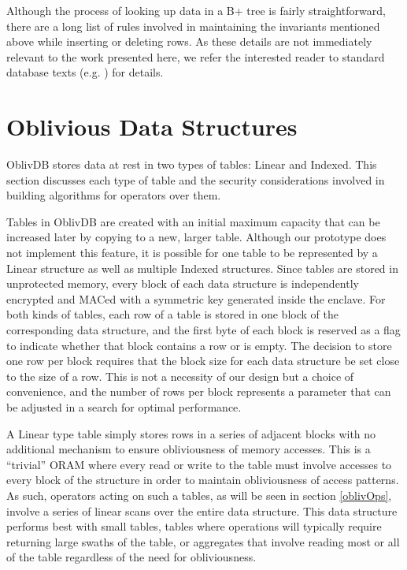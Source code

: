 \documentclass[conference]{IEEEtran}
\def\name/{OblivDB}
\begin{document}
Although the process of looking up data in a B+ tree is fairly straightforward, there are a long list of rules involved in maintaining the invariants mentioned above while inserting or deleting rows. As these details are not immediately relevant to the work presented here, we refer the interested reader to standard database texts (e.g. \cite{EN10}) for details. 

\section{Oblivious Data Structures}\label{oblivData}
\name/ stores data at rest in two types of tables: Linear and Indexed. This section discusses each type of table and the security considerations involved in building algorithms for operators over them. 

Tables in \name/ are created with an initial maximum capacity that can be increased later by copying to a new, larger table. Although our prototype does not implement this feature, it is possible for one table to be represented by a Linear structure as well as multiple Indexed structures. Since tables are stored in unprotected memory, every block of each data structure is independently encrypted and MACed with a symmetric key generated inside the enclave. For both kinds of tables, each row of a table is stored in one block of the corresponding data structure, and the first byte of each block is reserved as a flag to indicate whether that block contains a row or is empty. The decision to store one row per block requires that the block size for each data structure be set close to the size of a row. This is not a necessity of our design but a choice of convenience, and the number of rows per block represents a parameter that can be adjusted in a search for optimal performance.

A Linear type table simply stores rows in a series of adjacent blocks with no additional mechanism to ensure obliviousness of memory accesses. This is a ``trivial'' ORAM where every read or write to the table must involve accesses to every block of the structure in order to maintain obliviousness of access patterns. As such, operators acting on such a tables, as will be seen in section \ref{oblivOps}, involve a series of linear scans over the entire data structure. This data structure performs best with small tables, tables where operations will typically require returning large swaths of the table, or aggregates that involve reading most or all of the table regardless of the need for obliviousness.
\end{document}
